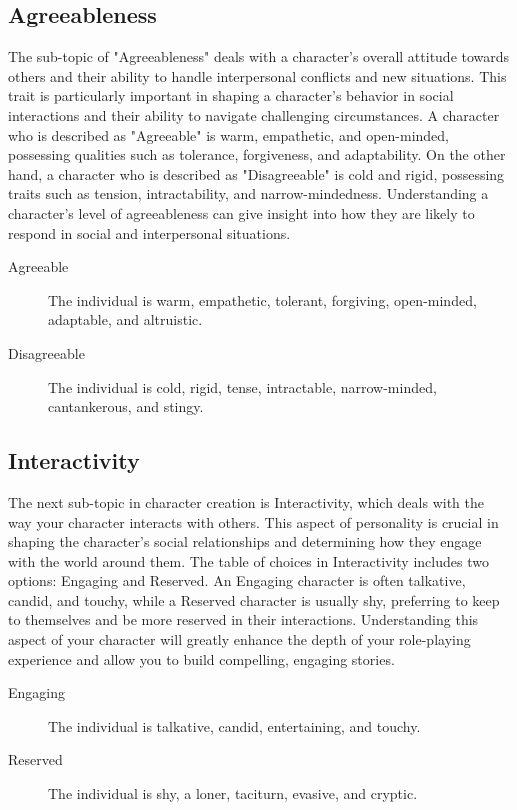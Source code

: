 \documentclass[12pt]{book}  %
\begin{document}
\subsection{\textbf{Agreeableness}}

The sub-topic of "Agreeableness" deals with a character's overall attitude towards others and their ability to handle interpersonal conflicts and new situations. This trait is particularly important in shaping a character's behavior in social interactions and their ability to navigate challenging circumstances. A character who is described as "Agreeable" is warm, empathetic, and open-minded, possessing qualities such as tolerance, forgiveness, and adaptability. On the other hand, a character who is described as "Disagreeable" is cold and rigid, possessing traits such as tension, intractability, and narrow-mindedness. Understanding a character's level of agreeableness can give insight into how they are likely to respond in social and interpersonal situations.

\begin{description}
    \item[Agreeable] The individual is warm, empathetic, tolerant, forgiving, open-minded, adaptable, and altruistic.
    \item[Disagreeable] The individual is cold, rigid, tense, intractable, narrow-minded, cantankerous, and stingy.
\end{description}

\subsection{\textbf{Interactivity}}

The next sub-topic in character creation is Interactivity, which deals with the way your character interacts with others. This aspect of personality is crucial in shaping the character's social relationships and determining how they engage with the world around them. The table of choices in Interactivity includes two options: Engaging and Reserved. An Engaging character is often talkative, candid, and touchy, while a Reserved character is usually shy, preferring to keep to themselves and be more reserved in their interactions. Understanding this aspect of your character will greatly enhance the depth of your role-playing experience and allow you to build compelling, engaging stories.

\begin{description}
    \item[Engaging] The individual is talkative, candid, entertaining, and touchy.
    \item[Reserved] The individual is shy, a loner, taciturn, evasive, and cryptic.
\end{description}
\end{document}
